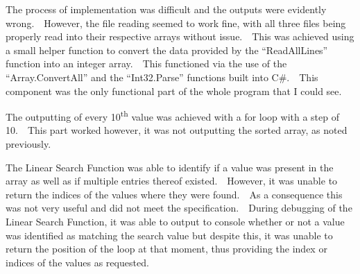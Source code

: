 \documentclass[11pt]{article} %
\begin{document}
The process of implementation was difficult and the outputs were evidently wrong.~~However, the file reading seemed to work fine, with all three files being properly read into their respective arrays without issue.~~This was achieved using a small helper function to convert the data provided by the ``ReadAllLines'' function into an integer array.~~This functioned via the use of the ``Array.ConvertAll'' and the ``Int32.Parse'' functions built into C\#.~~This component was the only functional part of the whole program that I could see.\par
The outputting of every 10\textsuperscript{th} value was achieved with a for loop with a step of 10.~~This part worked however, it was not outputting the sorted array, as noted previously.~~\par
The Linear Search Function was able to identify if a value was present in the array as well as if multiple entries thereof existed.~~However, it was unable to return the indices of the values where they were found.~~As a consequence this was not very useful and did not meet the specification.~~During debugging of the Linear Search Function, it was able to output to console whether or not a value was identified as matching the search value but despite this, it was unable to return the position of the loop at that moment, thus providing the index or indices of the values as requested.
\newpage
\end{document}
